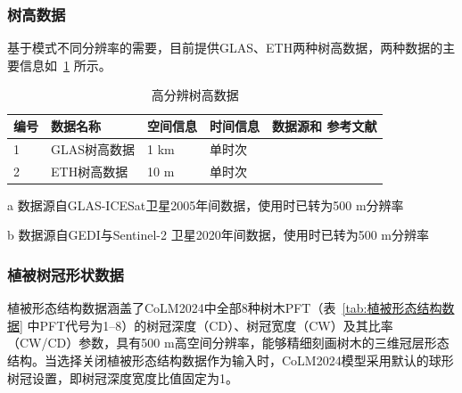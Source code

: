 \subsubsection{树高数据}\label{树高数据}
%
基于模式不同分辨率的需要，目前提供GLAS、ETH两种树高数据，两种数据的主要信息如~\ref{tab:树高数据表} 所示。
%
\begin{table}[htbp]
  \begin{threeparttable}
    \centering
    \caption{高分辨树高数据}
    \label{tab:树高数据表}
    \begin{tabular}{p{1cm}p{4.5cm}p{2cm}p{3cm}p{3cm}}
      \toprule
      编号 & 数据名称     & 空间信息 & 时间信息        & 数据源和 \newline 参考文献 \\
      \midrule
      1    & GLAS树高数据 & 1 km     & 单时次\tnote{a} & \cite{simard2011mapping}   \\
      2    & ETH树高数据  & 10 m     & 单时次\tnote{b} & \cite{lang2023high}        \\
      \bottomrule
    \end{tabular}
    \begin{tablenotes}
    \item [a] 数据源自GLAS-ICESat卫星2005年间数据，使用时已转为500 m分辨率
    \item [b] 数据源自GEDI与Sentinel-2 卫星2020年间数据，使用时已转为500 m分辨率
    \end{tablenotes}
  \end{threeparttable}
\end{table}
%

\subsubsection{植被树冠形状数据}\label{植被树冠形状数据}

植被形态结构数据涵盖了CoLM2024中全部8种树木PFT（表~\ref{tab:植被形态结构数据} 中PFT代号为1--8）的树冠深度（CD）、树冠宽度（CW）及其比率（CW/CD）参数，具有500 m高空间分辨率，能够精细刻画树木的三维冠层形态结构。当选择关闭植被形态结构数据作为输入时，CoLM2024模型采用默认的球形树冠设置，即树冠深度宽度比值固定为1。

